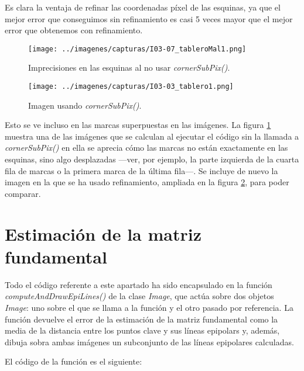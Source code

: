 \documentclass[a4paper, 11pt]{article}
\theoremstyle{definition}
\theoremstyle{theorem}
\begin{document}
    Es clara la ventaja de refinar las coordenadas píxel de las esquinas, ya que el mejor error que conseguimos sin refinamiento es casi 5 veces mayor que el mejor error que obtenemos con refinamiento.

    \begin{figure}[h!]
        \centering
        \texttt{[image: ../imagenes/capturas/I03-07\_tableroMal1.png]}
        \caption{Imprecisiones en las esquinas al no usar \emph{cornerSubPix()}. \label{sinSubPix}}
    \end{figure}
    \begin{figure}[h!]
        \centering
        \texttt{[image: ../imagenes/capturas/I03-03\_tablero1.png]}
        \caption{Imagen usando \emph{cornerSubPix()}. \label{conSubPix}}
    \end{figure}

    Esto se ve incluso en las marcas superpuestas en las imágenes. La figura \ref{sinSubPix} muestra una de las imágenes que se calculan al ejecutar el código sin la llamada a \emph{cornerSubPix()} en ella se aprecia cómo las marcas no están exactamente en las esquinas, sino algo desplazadas ---ver, por ejemplo, la parte izquierda de la cuarta fila de marcas o la primera marca de la última fila---. Se incluye de nuevo la imagen en la que se ha usado refinamiento, ampliada en la figura \ref{conSubPix}, para poder comparar.

    \newpage
    \section{Estimación de la matriz fundamental}
    Todo el código referente a este apartado ha sido encapsulado en la función \emph{computeAndDrawEpiLines()} de la clase \emph{Image}, que actúa sobre dos objetos \emph{Image}: uno sobre el que se llama a la función y el otro pasado por referencia. La función devuelve el error de la estimación de la matriz fundamental como la media de la distancia entre los puntos clave y sus líneas epipolars y, además, dibuja sobra ambas imágenes un subconjunto de las líneas epipolares calculadas.

    El código de la función es el siguiente:
\end{document}
